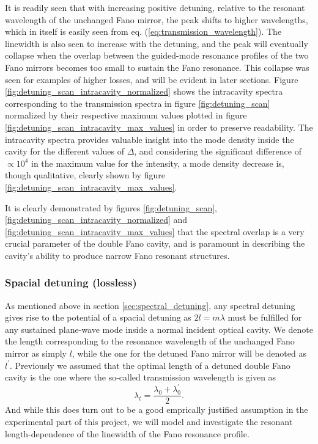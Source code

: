 It is readily seen that with increasing positive detuning, relative to the resonant wavelength of the unchanged Fano mirror, the peak shifts to higher wavelengths, which in itself is easily seen from eq. (\ref{eq:transmission_wavelength}). The linewidth is also seen to increase with the detuning, and the peak will eventually collapse when the overlap between the guided-mode resonance profiles of the two Fano mirrors becomes too small to sustain the Fano resonance. This collapse was seen for examples of higher losses, and will be evident in later sections. Figure \ref{fig:detuning_scan_intracavity_normalized} shows the intracavity spectra corresponding to the transmission spectra in figure \ref{fig:detuning_scan} normalized by their respective maximum values plotted in figure \ref{fig:detuning_scan_intracavity_max_values} in order to preserve readability. The intracavity spectra provides valuable insight into the mode density inside the cavity for the different values of $\Delta$, and considering the significant difference of $\propto 10^4$ in the maximum value for the intensity, a mode density decrease is, though qualitative, clearly shown by figure \ref{fig:detuning_scan_intracavity_max_values}.  

It is clearly demonstrated by figures \ref{fig:detuning_scan}, \ref{fig:detuning_scan_intracavity_normalized} and \ref{fig:detuning_scan_intracavity_max_values} that the spectral overlap is a very crucial parameter of the double Fano cavity, and is paramount in describing the cavity's ability to produce narrow Fano resonant structures. 

\subsubsection{Spacial detuning (lossless)} \label{sec:spacial_detuning}

As mentioned above in section \ref{sec:spectral_detuning}, any spectral detuning gives rise to the potential of a spacial detuning as $2l = m\lambda$ must be fulfilled for any sustained plane-wave mode inside a normal incident optical cavity. We denote the length corresponding to the resonance wavelength of the unchanged Fano mirror as simply $l$, while the one for the detuned Fano mirror will be denoted as $l^{\prime}$. Previously we assumed that the optimal length of a detuned double Fano cavity is the one where the so-called transmission wavelength is given as 
\begin{equation}
    \lambda_t = \frac{\lambda_{0} + \lambda_{0}^{\prime}}{2}.
\end{equation}
And while this does turn out to be a good emprically justified assumption in the experimental part of this project, we will model and investigate the resonant length-dependence of the linewidth of the Fano resonance profile. 

